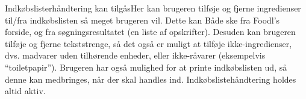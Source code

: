 {Indkøbslisterhåndtering kan tilgåsHer kan brugeren tilføje og fjerne ingredienser til/fra indkøbslisten så meget brugeren vil. Dette kan Både ske fra Foodl’s forside, og fra søgningsresultatet (en liste af opskrifter). Desuden kan brugeren tilføje og fjerne tekststrenge, så det også er muligt at tilføje ikke-ingredienser, dvs. madvarer uden tilhørende enheder, eller ikke-råvarer (eksempelvis “toiletpapir”). Brugeren har også mulighed for at printe indkøbslisten ud, så denne kan medbringes, når der skal handles ind. Indkøbslistehåndtering holdes altid aktiv.}
{}
{}
